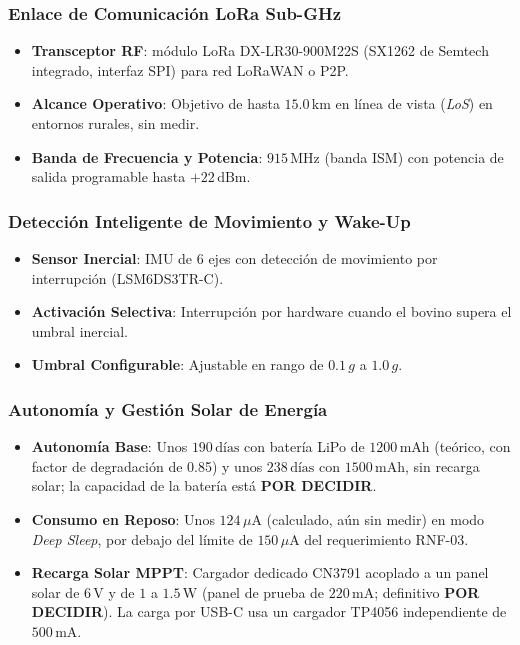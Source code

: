 \subsubsection{Enlace de Comunicación LoRa Sub-GHz}

\begin{itemize}[leftmargin=*]
    \item \textbf{Transceptor RF}: módulo LoRa DX-LR30-900M22S (SX1262 de Semtech integrado, interfaz SPI) para red LoRaWAN o P2P.
    \item \textbf{Alcance Operativo}: Objetivo de hasta $15.0\,\text{km}$ en línea de vista (\textit{LoS}) en entornos rurales, sin medir.
    \item \textbf{Banda de Frecuencia y Potencia}: $915\,\text{MHz}$ (banda ISM) con potencia de salida programable hasta $+22\,\text{dBm}$.
\end{itemize}

\subsubsection{Detección Inteligente de Movimiento y Wake-Up}

\begin{itemize}[leftmargin=*]
    \item \textbf{Sensor Inercial}: IMU de 6 ejes con detección de movimiento por interrupción (LSM6DS3TR-C).
    \item \textbf{Activación Selectiva}: Interrupción por hardware cuando el bovino supera el umbral inercial.
    \item \textbf{Umbral Configurable}: Ajustable en rango de $0.1\,g$ a $1.0\,g$.
\end{itemize}

\subsubsection{Autonomía y Gestión Solar de Energía}

\begin{itemize}[leftmargin=*]
    \item \textbf{Autonomía Base}: Unos $190\,\text{días}$ con batería LiPo de $1200\,\text{mAh}$ (teórico, con factor de degradación de 0.85) y unos $238\,\text{días}$ con $1500\,\text{mAh}$, sin recarga solar; la capacidad de la batería está \textbf{POR DECIDIR}.
    \item \textbf{Consumo en Reposo}: Unos $124\,\mu\text{A}$ (calculado, aún sin medir) en modo \textit{Deep Sleep}, por debajo del límite de $150\,\mu\text{A}$ del requerimiento RNF-03.
    \item \textbf{Recarga Solar MPPT}: Cargador dedicado CN3791 acoplado a un panel solar de $6\,\text{V}$ y de $1$ a $1.5\,\text{W}$ (panel de prueba de $220\,\text{mA}$; definitivo \textbf{POR DECIDIR}). La carga por USB-C usa un cargador TP4056 independiente de $500\,\text{mA}$.
\end{itemize}

